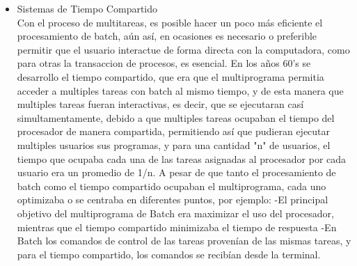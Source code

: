 \begin{itemize}
		\item Sistemas de Tiempo Compartido		\\
		Con el proceso de multitareas, es posible hacer un poco más eficiente el procesamiento de batch, aún así, en ocasiones es necesario o preferible permitir que el usuario interactue de forma directa con la computadora, como para otras la transaccion de procesos, es esencial. En los años 60's se desarrollo el tiempo compartido, que era que el multiprograma permitia acceder a multiples tareas con batch al mismo tiempo, y de esta manera que multiples tareas fueran interactivas, es decir, que se ejecutaran casí simultamentamente, debido a que multiples tareas ocupaban el tiempo del procesador de manera compartida, permitiendo así que pudieran ejecutar multiples usuarios sus programas, y para una cantidad "n" de usuarios, el tiempo que ocupaba cada una de las tareas asignadas al procesador por cada usuario era un promedio de 1/n. A pesar de que tanto el procesamiento de batch como el tiempo compartido ocupaban el multiprograma, cada uno optimizaba o se centraba en diferentes puntos, por ejemplo: -El principal objetivo del multiprograma de Batch era maximizar el uso del procesador, mientras que el tiempo compartido minimizaba el tiempo de respuesta -En Batch los comandos de control de las tareas provenían de las mismas tareas, y para el tiempo compartido, los comandos se recibían desde la terminal.

	\end{itemize}
